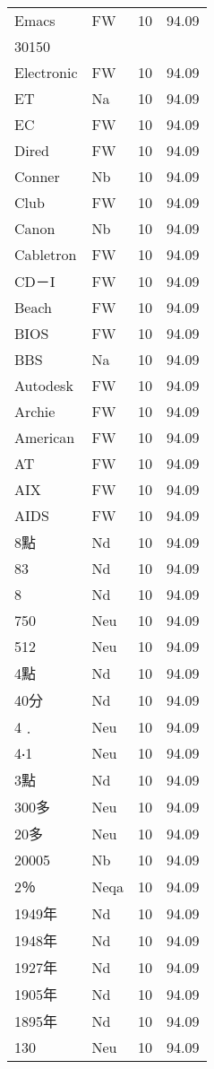 \documentclass[twocolumn]{book}
\begin{document}
\begin{supertabular}{llrr}
Emacs & FW & 10 &  94.09\\
30150\\
Electronic & FW & 10 &  94.09\\
ET & Na & 10 &  94.09\\
EC & FW & 10 &  94.09\\
Dired & FW & 10 &  94.09\\
Conner & Nb & 10 &  94.09\\
Club & FW & 10 &  94.09\\
Canon & Nb & 10 &  94.09\\
Cabletron & FW & 10 &  94.09\\
CD－I & FW & 10 &  94.09\\
Beach & FW & 10 &  94.09\\
BIOS & FW & 10 &  94.09\\
BBS & Na & 10 &  94.09\\
Autodesk & FW & 10 &  94.09\\
Archie & FW & 10 &  94.09\\
American & FW & 10 &  94.09\\
AT & FW & 10 &  94.09\\
AIX & FW & 10 &  94.09\\
AIDS & FW & 10 &  94.09\\
8點 & Nd & 10 &  94.09\\
83 & Nd & 10 &  94.09\\
8 & Nd & 10 &  94.09\\
750 & Neu & 10 &  94.09\\
512 & Neu & 10 &  94.09\\
4點 & Nd & 10 &  94.09\\
40分 & Nd & 10 &  94.09\\
4﹒ & Neu & 10 &  94.09\\
4‧1 & Neu & 10 &  94.09\\
3點 & Nd & 10 &  94.09\\
300多 & Neu & 10 &  94.09\\
20多 & Neu & 10 &  94.09\\
20005 & Nb & 10 &  94.09\\
2％ & Neqa & 10 &  94.09\\
1949年 & Nd & 10 &  94.09\\
1948年 & Nd & 10 &  94.09\\
1927年 & Nd & 10 &  94.09\\
1905年 & Nd & 10 &  94.09\\
1895年 & Nd & 10 &  94.09\\
130 & Neu & 10 &  94.09\\

\end{supertabular}
\end{document}
